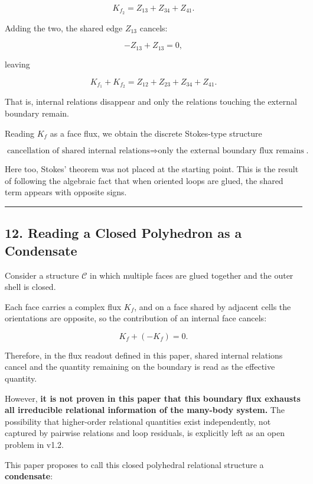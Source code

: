 \documentclass[
  a4paper,
]{article}
\begin{document}
\[
K_{f_2}=Z_{13}+Z_{34}+Z_{41}.
\]

Adding the two, the shared edge \(Z_{13}\) cancels:

\[
-Z_{13}+Z_{13}=0,
\]

leaving

\[
\boxed{K_{f_1}+K_{f_2}=Z_{12}+Z_{23}+Z_{34}+Z_{41}}.
\]

That is, internal relations disappear and only the relations touching
the external boundary remain.

Reading \(K_f\) as a face flux, we obtain the discrete Stokes-type
structure

\[
\boxed{\text{cancellation of shared internal relations}\Rightarrow\text{only the external boundary flux remains}}.
\]

Here too, Stokes' theorem was not placed at the starting point. This is
the result of following the algebraic fact that when oriented loops are
glued, the shared term appears with opposite signs.

\begin{center}\rule{0.5\linewidth}{0.5pt}\end{center}

\subsection{12. Reading a Closed Polyhedron as a
Condensate}\label{reading-a-closed-polyhedron-as-a-condensate}

Consider a structure \(\mathcal C\) in which multiple faces are glued
together and the outer shell is closed.

Each face carries a complex flux \(K_f\), and on a face shared by
adjacent cells the orientations are opposite, so the contribution of an
internal face cancels:

\[
K_f+(-K_f)=0.
\]

Therefore, in the flux readout defined in this paper, shared internal
relations cancel and the quantity remaining on the boundary is read as
the effective quantity.

However, \textbf{it is not proven in this paper that this boundary flux
exhausts all irreducible relational information of the many-body
system.} The possibility that higher-order relational quantities exist
independently, not captured by pairwise relations and loop residuals, is
explicitly left as an open problem in v1.2.

This paper proposes to call this closed polyhedral relational structure
a \textbf{condensate}:
\end{document}

